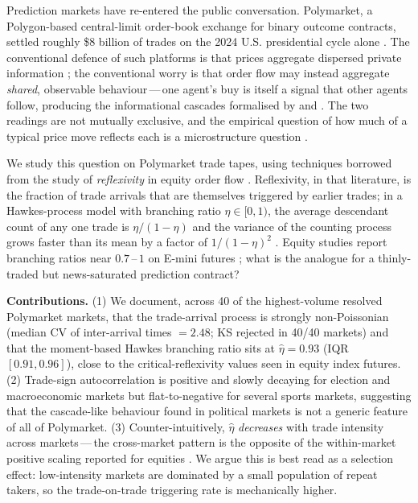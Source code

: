 \documentclass{article}
\begin{document}
Prediction markets have re-entered the public conversation. Polymarket, a
Polygon-based central-limit order-book exchange for binary outcome
contracts, settled roughly \$8 billion of trades on the 2024 U.S.
presidential cycle alone \citep{tsang2026anatomy}. The conventional
defence of such platforms is that prices aggregate dispersed private
information \citep{wolfers2004prediction,arrow2008promise}; the
conventional worry is that order flow may instead aggregate
\emph{shared}, observable behaviour\,---\,one agent's buy is itself a
signal that other agents follow, producing the informational cascades
formalised by \citet{bikhchandani1992theory} and \citet{banerjee1992simple}.
The two readings are not mutually exclusive, and the empirical question of
how much of a typical price move reflects each is a microstructure
question \citep{kyle1985continuous,bouchaud2004fluctuations}.

We study this question on Polymarket trade tapes, using techniques
borrowed from the study of \emph{reflexivity} in equity order flow
\citep{filimonov2012quantifying,hardiman2013critical,bacry2015hawkes}.
Reflexivity, in that literature, is the fraction of trade arrivals that
are themselves triggered by earlier trades; in a Hawkes-process model
with branching ratio $\eta\!\in\![0,1)$, the average descendant count of
any one trade is $\eta/(1-\eta)$ and the variance of the counting
process grows faster than its mean by a factor of $1/(1-\eta)^2$
\citep{bacry2015hawkes,hardiman2013critical}. Equity studies report
branching ratios near $0.7$\,--\,$1$ on E-mini futures
\citep{filimonov2012quantifying,hardiman2013critical}; what is the
analogue for a thinly-traded but news-saturated prediction
contract?

\textbf{Contributions.} (1) We document, across 40 of the highest-volume
resolved Polymarket markets, that the trade-arrival process is strongly
non-Poissonian (median CV of inter-arrival times $=2.48$; KS rejected
in 40/40 markets) and that the moment-based Hawkes branching ratio sits
at $\hat\eta\!=\!0.93$ (IQR $[0.91,0.96]$), close to the
critical-reflexivity values seen in equity index futures.
(2) Trade-sign autocorrelation is positive and slowly decaying for
election and macroeconomic markets but flat-to-negative for several
sports markets, suggesting that the cascade-like behaviour found in
political markets is not a generic feature of all of Polymarket.
(3) Counter-intuitively, $\hat\eta$ \emph{decreases} with trade
intensity across markets\,---\,the cross-market pattern is the opposite
of the within-market positive scaling reported for equities
\citep{hardiman2013critical}. We argue this is best read as a
selection effect: low-intensity markets are dominated by a small
population of repeat takers, so the trade-on-trade triggering rate is
mechanically higher.
\end{document}
